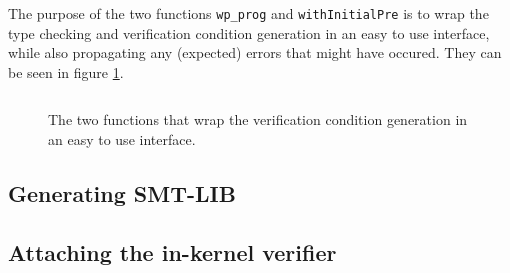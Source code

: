 The purpose of the two functions \texttt{wp\_prog} and \texttt{withInitialPre} is to wrap the type checking and verification condition generation in an easy to use interface, while also propagating any (expected) errors that might have occured. They can be seen in figure \ref{snip:wp_prog_wrap}.

\begin{figure}[ht]
  \centering
\inputminted[linenos,breaklines]{haskell}{snippets/wp_prog_wrap.hs}
  \caption{The two functions that wrap the verification condition generation in an easy to use interface.}
  \label{snip:wp_prog_wrap}
\end{figure}


\subsection{Generating SMT-LIB}
\label{subsec:generating_smt-lib}



\subsection{Attaching the in-kernel verifier}
\label{subsec:attaching_the_in-kernel_verifier}








